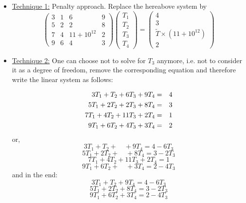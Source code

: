 \begin{itemize}

\item \underline{Technique 1:} Penalty approach. Replace the hereabove system by
\[
\left(
\begin{array}{cccc}
3 & 1 & 6  & 9 \\
5 & 2 & 2  & 8 \\
7 & 4 & 11 +  10^{12} & 2 \\
9 & 6 & 4  & 3
\end{array}
\right)
\left(
\begin{array}{c}
T_1 \\ T_2 \\ T_3 \\ T_4
\end{array}
\right)
=
\left(
\begin{array}{c}
4 \\ 3 \\ \tilde{T}\times (11 + 10^{12}) \\ 2
\end{array}
\right)
\]




\item \underline{Technique 2:} One can choose not to solve for $T_3$ anymore, i.e. not to consider it as a degree of freedom, remove the corresponding 
equation and therefore write the linear system as follows:

\begin{eqnarray}
3 T_1 + T_2 + 6 T_3 + 9 T_4 &=& 4 \nonumber\\
5 T_1 + 2T_2 + 2 T_3 + 8 T_4 &=& 3 \nonumber\\
7 T_1 + 4T_2 + 11 T_3 + 2 T_4 &=& 1 \nonumber\\
9 T_1 + 6T_2 + 4 T_3 + 3 T_4 &=& 2\nonumber
\end{eqnarray}
or, 
\[
3 T_1 + T_2 + \quad  + 9 T_4 = 4 - 6T_3
\]
\[
5 T_1 + 2T_2 + \quad + 8 T_4 = 3 - 2T_3
\]
\[
7 T_1 + 4T_2 + 11T_3 + 2 T_4 = 1 
\]
\[
9 T_1 + 6T_2 + \quad + 3 T_4 = 2 - 4T_3
\]
and in the end:
\[
3 T_1 + T_2 + 9 T_4 = 4 - 6T_3
\]
\[
5 T_1 + 2T_2 + 8 T_4 = 3 - 2T_3
\]
\[
9 T_1 + 6T_2 +  3 T_4 = 2 - 4T_3
\]



\end{itemize}
